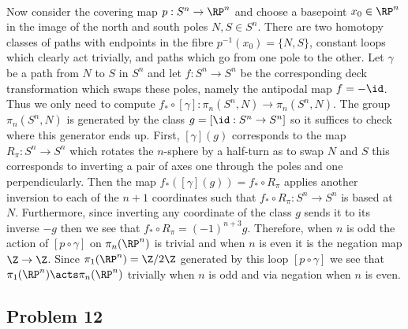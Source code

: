 \documentclass[12pt]{extarticle}
\begin{document}
\bigskip\\
Now consider the covering map $p : S^n \to \RP^n$ and choose a basepoint $x_0 \in \RP^n$ in the image of the north and south poles $N,S \in S^n$. There are two homotopy classes of paths with endpoints in the fibre $p^{-1}(x_0) = \{ N, S \}$, constant loops which clearly act trivially, and paths which go from one pole to the other. Let $\gamma$ be a path from $N$ to $S$ in $S^n$ and let $f : S^n \to S^n$ be the corresponding deck transformation which swaps these poles, namely the antipodal map $f = - \id$. Thus we only need to compute $f_* \circ [\gamma] : \pi_n(S^n, N) \to \pi_n(S^n, N)$. The group $\pi_n(S^n, N)$ is generated by the class $g = [ \id : S^n \to S^n ]$ so it suffices to check where this generator ends up. First, $[\gamma](g)$ corresponds to the map $R_\pi : S^n \to S^n$ which rotates the $n$-sphere by a half-turn as to swap $N$ and $S$ this corresponds to inverting a pair of axes one through the poles and one perpendicularly. Then the map $f_*([\gamma](g)) = f_* \circ R_\pi$ applies another inversion to each of the $n+1$ coordinates such that $f_* \circ R_\pi : S^n \to S^n$ is based at $N$. Furthermore, since inverting any coordinate of the class $g$ sends it to its inverse $-g$ then we see that $f_* \circ R_\pi = (-1)^{n + 3} g$. Therefore, when $n$ is odd the action of $[p \circ \gamma]$ on $\pi_n(\RP^n)$ is trivial and when $n$ is even it is the negation map $\Z \to \Z$. Since $\pi_1(\RP^n) = \Z / 2 \Z$ generated by this loop $[p \circ \gamma]$ we see that $\pi_1(\RP^n) \acts \pi_n(\RP^n)$ trivially when $n$ is odd and via negation when $n$ is even. 

\subsection{Problem 12} 
\end{document}

